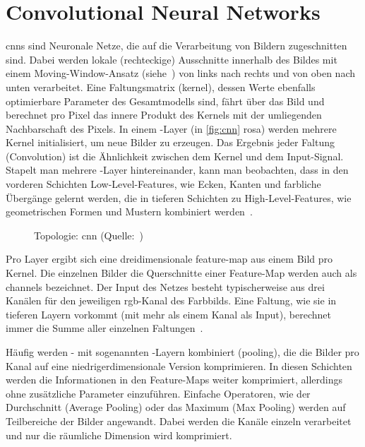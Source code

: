 \label{sec:conv}

\section{Convolutional Neural Networks}
\label{sec:cnn}

\glspl{cnn} sind Neuronale Netze, die auf die Verarbeitung von Bildern zugeschnitten sind.
Dabei werden lokale (rechteckige) Ausschnitte innerhalb des Bildes mit einem Moving-Window-Ansatz (siehe~\cite{Burkov19}) von links nach rechts und von oben nach unten verarbeitet.
Eine Faltungsmatrix (\gls{kernel}), dessen Werte ebenfalls optimierbare Parameter des Gesamtmodells sind, fährt über das Bild und berechnet pro Pixel das innere Produkt des Kernels mit der umliegenden Nachbarschaft des Pixels.
In einem \conv-Layer (in \autoref{fig:cnn} rosa) werden mehrere Kernel initialisiert, um neue Bilder zu erzeugen.
Das Ergebnis jeder Faltung (Convolution) ist die Ähnlichkeit zwischen dem Kernel und dem Input-Signal.
Stapelt man mehrere \conv-Layer hintereinander, kann man beobachten, dass in den vorderen Schichten Low-Level-Features, wie Ecken, Kanten und farbliche Übergänge gelernt werden, die in tieferen Schichten zu High-Level-Features, wie geometrischen Formen und Mustern kombiniert werden~\cite{Burkov19}.

\begin{figure}[hb!]
    \centering
    \caption{Topologie: \gls{cnn} (Quelle:~\cite{Veen17})}
    \label{fig:cnn}
\end{figure}

Pro Layer ergibt sich eine dreidimensionale \gls{feature-map} aus einem Bild pro Kernel.
Die einzelnen Bilder \bzw die Querschnitte einer Feature-Map werden auch als \glspl{channel} bezeichnet.
Der Input des Netzes besteht typischerweise aus drei Kanälen für den jeweiligen \gls{rgb}-Kanal des Farbbilds.
Eine Faltung, wie sie in tieferen Layern vorkommt (mit mehr als einem Kanal als Input), berechnet immer die Summe aller einzelnen Faltungen~\cite{Burkov19}.

Häufig werden \conv- mit sogenannten \pool-Layern kombiniert (\gls{pooling}), die die Bilder pro Kanal auf eine niedrigerdimensionale Version komprimieren.
In diesen Schichten werden die Informationen in den Feature-Maps weiter komprimiert, allerdings ohne zusätzliche Parameter einzuführen.
Einfache Operatoren, wie der Durchschnitt (Average Pooling) oder das Maximum (Max Pooling) werden auf Teilbereiche der Bilder angewandt.
Dabei werden die Kanäle einzeln verarbeitet und nur die räumliche Dimension wird komprimiert.

